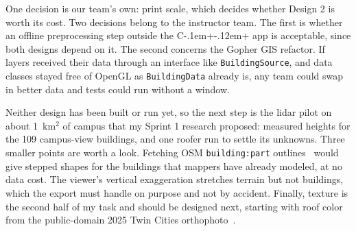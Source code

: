 \documentclass[11pt,letterpaper]{article}
\newcommand{\cpp}{C\kern-.1em+\kern-.12em+}
\begin{document}
One decision is our team's own: print scale, which decides whether Design 2 is worth its cost. Two decisions belong to the instructor team. The first is whether an offline preprocessing step outside the \cpp{} app is acceptable, since both designs depend on it. The second concerns the Gopher GIS refactor. If layers received their data through an interface like \texttt{BuildingSource}, and data classes stayed free of OpenGL as \texttt{BuildingData} already is, any team could swap in better data and tests could run without a window.

Neither design has been built or run yet, so the next step is the lidar pilot on about 1~km$^2$ of campus that my Sprint 1 research proposed: measured heights for the 109 campus-view buildings, and one roofer run to settle its unknowns. Three smaller points are worth a look. Fetching OSM \texttt{building:part} outlines~\cite{s3db} would give stepped shapes for the buildings that mappers have already modeled, at no data cost. The viewer's vertical exaggeration stretches terrain but not buildings, which the export must handle on purpose and not by accident. Finally, texture is the second half of my task and should be designed next, starting with roof color from the public-domain 2025 Twin Cities orthophoto~\cite{metro2025}.
\end{document}
